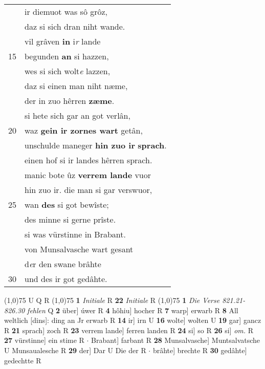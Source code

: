 \documentclass[8pt,a4paper,notitlepage]{article}
\begin{document}
\begin{table}[ht]
\begin{minipage}[t]{0.5\linewidth}
\begin{tabular}{rl}
 & ir diemuot was sô grôz,\\ 
 & daz si sich dran niht wande.\\ 
 & vil grâven \textbf{in} i\textit{r} lande\\ 
15 & begunden \textbf{an} si hazzen,\\ 
 & wes si sich wolt\textit{e} lazzen,\\ 
 & daz si einen man niht næme,\\ 
 & der in zuo hêrren \textbf{zæme}.\\ 
 & si hete sich gar an got verlân,\\ 
20 & waz \textbf{gein ir zornes wart} getân,\\ 
 & unschulde maneger \textbf{hin zuo ir} \textbf{sprach}.\\ 
 & einen hof si ir landes hêrren sprach.\\ 
 & manic bote ûz \textbf{verrem lande} vuor\\ 
 & hin zuo ir. die man si gar verswuor,\\ 
25 & wan \textbf{des} si got bewîste;\\ 
 & des minne si gerne prîste.\\ 
 & si was vürstinne in Brabant.\\ 
 & von Munsalvasche wart gesant\\ 
 & d\textit{e}r den swane brâhte\\ 
30 & und des ir got gedâhte.\\ 
\end{tabular}
\scriptsize
\line(1,0){75} \newline
U Q R \newline
\line(1,0){75} \newline
\textbf{1} \textit{Initiale} R  \textbf{22} \textit{Initiale} R  \newline
\line(1,0){75} \newline
\textbf{1} \textit{Die Verse 821.21-826.30 fehlen} Q  \textbf{2} über] úwer R \textbf{4} hôhiu] hocher R \textbf{7} warp] erwarb R \textbf{8} All weltlich [dins]: ding an Jr erwarb R \textbf{14} ir] irn U \textbf{16} wolte] wolten U \textbf{19} gar] gancz R \textbf{21} sprach] zoch R \textbf{23} verrem lande] ferren landen R \textbf{24} si] so R \textbf{26} si] \textit{om.} R \textbf{27} vürstinne] ein stime R  $\cdot$ Brabant] farbant R \textbf{28} Munsalvasche] Muntsalvatsche U Munsaualesche R \textbf{29} der] Dar U Die der R  $\cdot$ brâhte] brechte R \textbf{30} gedâhte] gedechtte R \newline
\end{minipage}
\end{table}
\end{document}
